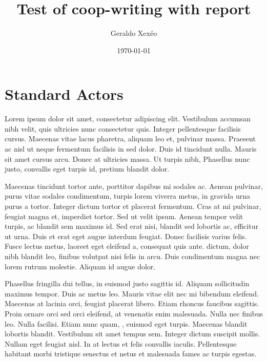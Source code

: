 \documentclass[12pt,a4paper]{article}
\author{Geraldo Xexéo}
\date{\today}
\title{Test of coop-writing with report}
\begin{document}
\maketitle

\section{Standard Actors}

Lorem ipsum dolor sit amet, consectetur adipiscing elit. Vestibulum accumsan nibh velit, quis ultricies nunc consectetur quis. Integer pellentesque facilisis cursus. Maecenas vitae lacus pharetra, aliquam leo et, pulvinar massa. Praesent ac nisl ut neque fermentum facilisis in sed dolor. Duis id tincidunt nulla. Mauris sit amet cursus arcu. Donec at ultricies massa. Ut turpis nibh,  Phasellus nunc justo, convallis eget turpis id, pretium blandit dolor.

Maecenas tincidunt tortor ante, porttitor dapibus mi sodales ac. Aenean pulvinar, purus vitae sodales condimentum, turpis lorem viverra metus, in gravida urna purus a tortor. Integer dictum tortor et placerat fermentum. Cras at mi pulvinar, feugiat magna et, imperdiet tortor. Sed ut velit ipsum. Aenean tempor velit turpis, ac blandit sem maximus id. Sed erat nisi, blandit sed lobortis ac, efficitur ut urna. Duis et erat eget augue interdum feugiat. Donec facilisis varius felis. Fusce lectus metus, laoreet eget eleifend a, consequat quis ante.  dictum, dolor nibh blandit leo, finibus volutpat nisi felis in arcu. Duis condimentum magna nec lorem rutrum molestie. Aliquam id augue dolor.

Phasellus fringilla dui tellus, in euismod justo sagittis id. Aliquam sollicitudin maximus tempor. Duis ac metus leo. Mauris vitae elit nec mi bibendum eleifend. Maecenas at lacinia orci, feugiat placerat libero. Etiam rhoncus faucibus sagittis. Proin ornare orci sed orci eleifend, at venenatis enim malesuada. Nulla nec finibus leo. Nulla facilisi. Etiam nunc quam, , euismod eget turpis. Maecenas blandit lobortis blandit. Vestibulum sit amet tempus sem. Integer dictum suscipit mollis. Nullam eget feugiat nisl. In at lectus et felis convallis iaculis. Pellentesque habitant morbi tristique senectus et netus et malesuada fames ac turpis egestas.
\end{document}
